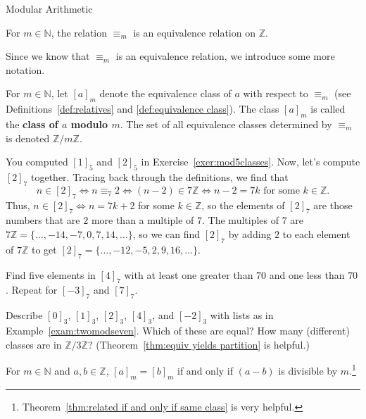 \begin{section}{Modular Arithmetic}
\begin{theorem}
For  $m\in \mathbb{N}$, the relation $\equiv_m$ is an equivalence relation on $\mathbb{Z}$.
\end{theorem}

Since we know that $\equiv_m$ is an equivalence relation, we introduce some more notation.

\begin{definition}\label{def:modulo}
For  $m\in \mathbb{N}$, let $[a]_m$ denote the equivalence class of $a$ with respect to $\equiv_m$ (see Definitions~\ref{def:relatives} and \ref{def:equivalence class}). The class $[a]_m$ is called the \textbf{class of $a$ modulo $m$}. The set of all equivalence classes determined by  $\equiv_m$ is denoted $\mathbb{Z}/m\mathbb{Z}$.
\end{definition}

\begin{example}\label{exam:twomodseven}
You computed $[1]_5$ and $[2]_5$ in Exercise~\ref{exer:mod5classes}. Now, let's compute $[2]_7$ together. 
Tracing back through the definitions, we find that \[n \in [2]_7 \iff n \equiv_7 2 \iff (n-2)\in 7\mathbb{Z} \iff n-2 = 7k \text{ for some $k\in \mathbb{Z}$}.\] Thus, $n \in [2]_7 \iff n = 7k +2$ for some $k\in \mathbb{Z}$, so the elements of $[2]_7$ are those numbers that are $2$ more than a multiple of $7$. The multiples of $7$ are $7\mathbb{Z} = \{\ldots,-14,-7,0,7,14,\ldots\}$, so we can find $[2]_7$ by adding $2$ to each element of $7\mathbb{Z}$ to get $[2]_7 = \{\ldots,-12,-5,2,9,16,\ldots\}$. 
\end{example}

\begin{exercise}
Find five elements in $[4]_7$ with at least one greater than $70$ and one less than $70$. Repeat for $[-3]_7$ and $[7]_7$.
\end{exercise}

\begin{exercise}
Describe $[0]_3$, $[1]_3$, $[2]_3$, $[4]_3$, and $[-2]_3$ with lists as in Example~\ref{exam:twomodseven}. Which of these are equal?   How many (different) classes are in $\mathbb{Z}/3\mathbb{Z}$? (Theorem~\ref{thm:equiv yields partition} is helpful.)
\end{exercise}

\begin{theorem}\label{thm.congclassesequal}
For  $m\in \mathbb{N}$ and $a,b\in \mathbb{Z}$, $[a]_m = [b]_m$ if and only if $(a-b)$ is divisible by $m$.\footnote{Theorem~\ref{thm:related if and only if same class} is very helpful.} 
\end{theorem}


\end{section}
